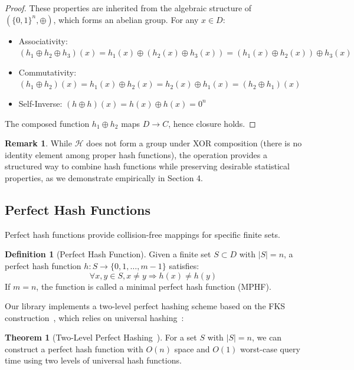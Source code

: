 \documentclass[11pt,a4paper]{article}
\theoremstyle{definition}
\newtheorem{definition}{Definition}[section]
\newtheorem{theorem}{Theorem}[section]
\newtheorem{remark}{Remark}[section]
\begin{document}
\begin{proof}
These properties are inherited from the algebraic structure of $(\{0,1\}^n, \oplus)$, which forms an abelian group. For any $x \in D$:
\begin{itemize}
    \item Associativity: $(h_1 \oplus h_2 \oplus h_3)(x) = h_1(x) \oplus (h_2(x) \oplus h_3(x)) = (h_1(x) \oplus h_2(x)) \oplus h_3(x)$
    \item Commutativity: $(h_1 \oplus h_2)(x) = h_1(x) \oplus h_2(x) = h_2(x) \oplus h_1(x) = (h_2 \oplus h_1)(x)$
    \item Self-Inverse: $(h \oplus h)(x) = h(x) \oplus h(x) = 0^n$
\end{itemize}
The composed function $h_1 \oplus h_2$ maps $D \rightarrow C$, hence closure holds.
\end{proof}

\begin{remark}
While $\mathcal{H}$ does not form a group under XOR composition (there is no identity element among proper hash functions), the operation provides a structured way to combine hash functions while preserving desirable statistical properties, as we demonstrate empirically in Section 4.
\end{remark}

\subsection{Perfect Hash Functions}

Perfect hash functions provide collision-free mappings for specific finite sets.

\begin{definition}[Perfect Hash Function]
Given a finite set $S \subset D$ with $|S| = n$, a perfect hash function $h: S \rightarrow \{0, 1, \ldots, m-1\}$ satisfies:
$$
\forall x, y \in S, x \neq y \Rightarrow h(x) \neq h(y)
$$
If $m = n$, the function is called a minimal perfect hash function (MPHF).
\end{definition}

Our library implements a two-level perfect hashing scheme based on the FKS construction~\cite{perfect}, which relies on universal hashing~\cite{universal}:

\begin{theorem}[Two-Level Perfect Hashing~\cite{perfect}]
For a set $S$ with $|S| = n$, we can construct a perfect hash function with $O(n)$ space and $O(1)$ worst-case query time using two levels of universal hash functions.
\end{theorem}
\end{document}
